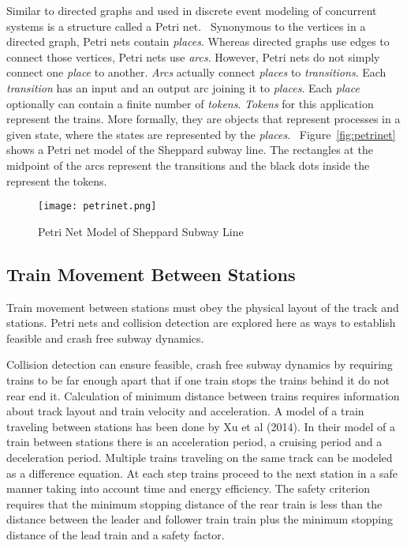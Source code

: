 Similar to directed graphs and used in discrete event modeling of concurrent systems is a structure called a Petri net.~\cite{Petri62}  Synonymous to the vertices in a directed graph, Petri nets contain \textit{places}.  Whereas directed graphs use edges to connect those vertices, Petri nets use \textit{arcs}. However, Petri nets do not simply connect one \textit{place} to another.  \textit{Arcs} actually connect \textit{places} to \textit{transitions}. Each \textit{transition} has an input and an output arc joining it to \textit{places}.  Each \textit{place} optionally can contain a finite number of \textit{tokens}.  \textit{Tokens} for this application represent the trains.  More formally, they are objects that represent processes in a given state, where the states are represented by the \textit{places}.~\cite{Kristoffersen2003}  Figure~\ref{fig:petrinet} shows a Petri net model of the Sheppard subway line. The rectangles at the midpoint of the arcs represent the transitions and the black dots inside the represent the tokens.
\begin{figure}[htb]
	\centering
	\texttt{[image: petrinet.png]}
	\caption{Petri Net Model of Sheppard Subway Line}
	\label{fig:directedgraph}
\end{figure}

\subsection{Train Movement Between Stations}

Train movement between stations must obey the physical layout of the track and
stations. Petri nets and collision detection are explored here as ways to
establish feasible and crash free subway dynamics.

Collision detection can ensure feasible, crash free subway dynamics by requiring
trains to be far enough apart that if one train stops the trains behind it do
not rear end it. Calculation of minimum distance between trains requires
information about track layout and train velocity and acceleration. A model of a
train traveling between stations has been done by Xu et al (2014). In their
model of a train between stations there is an acceleration period, a cruising
period and a deceleration period. Multiple trains traveling on the same track
can be modeled as a difference equation. At each step trains proceed to the next
station in a safe manner taking into account time and energy efficiency. The
safety criterion requires that the minimum stopping distance of the rear train
is less than the distance between the leader and follower train train plus the
minimum stopping distance of the lead train and a safety factor. 

